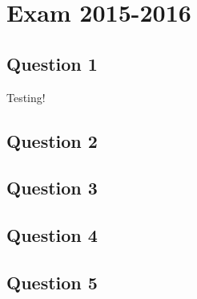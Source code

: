 \section{Exam 2015-2016}

\subsection{Question 1}
Testing!
\subsection{Question 2}
\subsection{Question 3}
\subsection{Question 4}
\subsection{Question 5}